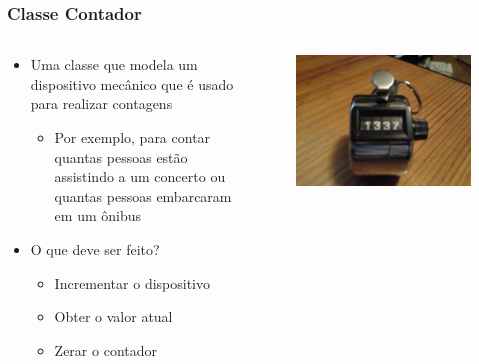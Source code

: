 \documentclass[aspectratio=169]{beamer}
\begin{document}
\begin{frame}\frametitle{Classe Contador}
\begin{columns}[T]
\begin{column}{0.5\linewidth}
\begin{itemize}
	\item Uma classe que modela um dispositivo mecânico que é usado para realizar contagens
	\begin{itemize}
		\item Por exemplo, para contar quantas pessoas estão assistindo a um concerto ou quantas pessoas embarcaram em um ônibus
	\end{itemize}
	\item O que deve ser feito?
	\begin{itemize}
		\item Incrementar o dispositivo
		\item Obter o valor atual
		\item Zerar o contador
	\end{itemize}
\end{itemize}
\end{column}
\begin{column}{0.5\linewidth}
\begin{figure}[h]
	\centering
	\includegraphics[height=0.45\paperheight]{pucrs-ec-poo-unidade_04-classes_e_objetos-laminas-contador.jpg}
\end{figure}
\end{column}
\end{columns}
\end{frame}
\end{document}

